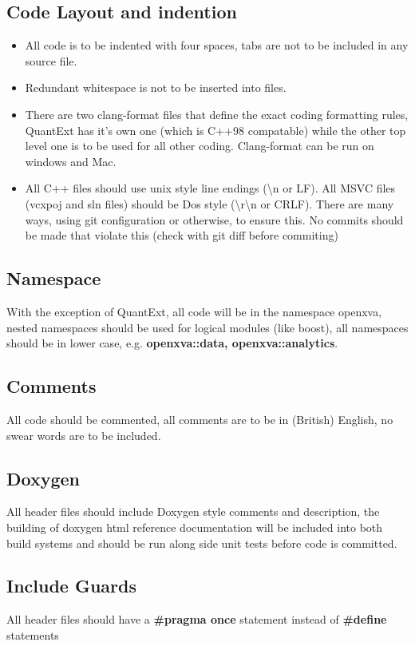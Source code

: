 \documentclass[12pt, a4paper]{article}
\begin{document}
\subsection*{Code Layout and indention}
\begin{itemize}
\item All code is to be indented with four spaces, tabs are not to be included in any source file.
\item Redundant whitespace is not to be inserted into files. 
\item There are two clang-format files that define the exact coding formatting rules, QuantExt has it's own one (which is C++98 compatable) while the other top level one is to be used for all other coding. Clang-format can be run on windows and Mac.
\item All C++ files should use unix style line endings (\textbackslash n or LF). All MSVC files (vcxpoj and sln files) should be Dos style (\textbackslash r\textbackslash n or CRLF). There are many ways, using git configuration or otherwise, to ensure this. No commits should be made that violate this (check with git diff before commiting)
\end{itemize}

\subsection*{Namespace}
With the exception of QuantExt, all code will be in the namespace openxva, nested namespaces should be used for logical modules (like boost), all namespaces should be in lower case, e.g. \textbf{openxva::data, openxva::analytics}.

\subsection*{Comments}
All code should be commented, all comments are to be in (British) English, no swear words are to be included.

\subsection*{Doxygen}
All header files should include Doxygen style comments and description, the building of doxygen html reference documentation will be included into both build systems and should be run along side unit tests before code is committed.

\subsection*{Include Guards}
All header files should have a \textbf{\#pragma once} statement instead of \textbf{\#define} statements
\end{document}
